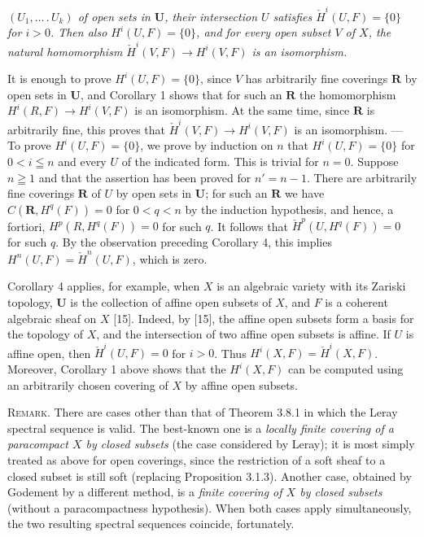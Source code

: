 
\noindent\textit{$(U_1,\ldots\mathpunct{.}U_k)$ of open sets in $\mathbf U$, their
intersection $U$ satisfies $\check H^i(U,F)=\{0\}$ for $i>0$. Then also
$H^i(U,F)=\{0\}$, and for every open subset $V$ of $X$, the natural
homomorphism $\check H^i(V,F)\to H^i(V,F)$ is an isomorphism.}

It is enough to prove $H^i(U,F)=\{0\}$, since $V$ has arbitrarily fine
coverings $\mathbf R$ by open sets in $\mathbf U$, and Corollary 1 shows that
for such an $\mathbf R$ the homomorphism
$H^i(R,F)\to H^i(V,F)$ is an isomorphism. At the same time,
since $\mathbf R$ is arbitrarily fine, this proves that
$\check H^i(V,F)\to H^i(V,F)$ is an isomorphism.
--- To prove $H^i(U,F)=\{0\}$, we prove by induction on $n$ that
$H^i(U,F)=\{0\}$ for $0<i\leqq n$ and every $U$ of the indicated form. This is
trivial for $n=0$. Suppose $n\geqq 1$ and that the assertion has been proved
for $n'=n-1$. There are arbitrarily fine coverings $\mathbf R$ of $U$ by open
sets in $\mathbf U$; for such an $\mathbf R$ we have
$C(\mathbf R,H^q(F))=0$ for $0<q<n$
by the induction hypothesis, and hence, a fortiori,
$H^p(R,H^q(F))=0$ for such $q$.
It follows that
$\check H^p(U,H^q(F))=0$ for such $q$.
By the observation preceding Corollary 4, this implies
$H^n(U,F)=\check H^n(U,F)$,
which is zero.

Corollary 4 applies, for example, when $X$ is an algebraic variety with its
Zariski topology, $\mathbf U$ is the collection of affine open subsets of
$X$, and $F$ is a coherent algebraic sheaf on $X$ [15]. Indeed, by [15], the
affine open subsets form a basis for the topology of $X$, and the intersection
of two affine open subsets is affine. If $U$ is affine open, then
$\check H^i(U,F)=0$ for $i>0$. Thus
$H^i(X,F)=\check H^i(X,F)$.
Moreover, Corollary 1 above shows that the $H^i(X,F)$ can be computed using an
arbitrarily chosen covering of $X$ by affine open subsets.

\textsc{Remark.} There are cases other than that of Theorem 3.8.1 in
which the Leray spectral sequence is valid. The best-known one is a
\textit{locally finite covering of a paracompact $X$ by closed subsets} (the
case considered by Leray); it is most simply treated as above for open coverings, since the restriction of a soft sheaf to a closed subset is still
soft (replacing Proposition 3.1.3). Another case, obtained by Godement
by a different method, is a \textit{finite covering of $X$ by closed subsets}
(without a paracompactness hypothesis). When both cases apply simultaneously,
the two resulting spectral sequences coincide, fortunately.

